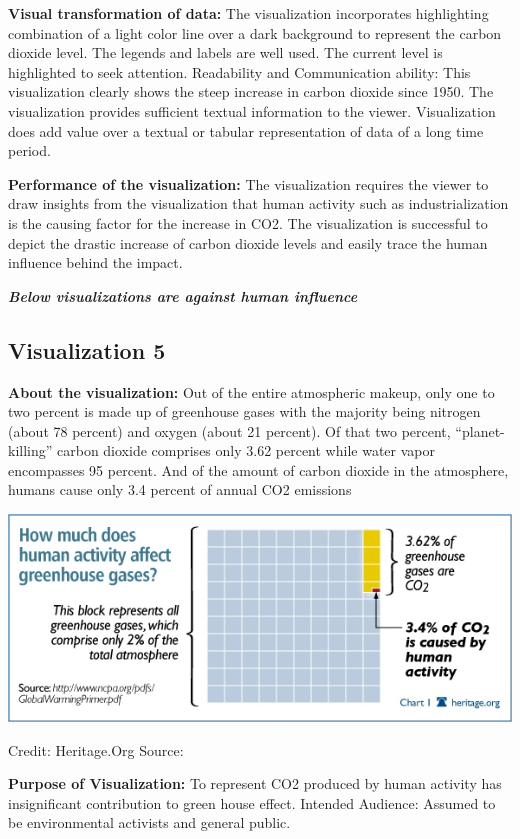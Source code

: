 \documentclass[]{book}
\begin{document}
\textbf{Visual transformation of data:} The visualization incorporates highlighting combination of a light color line over a dark background to represent the carbon dioxide level. The legends and labels are well used. The current level is highlighted to seek attention.
Readability and Communication ability: This visualization clearly shows the steep increase in carbon dioxide since 1950. The visualization provides sufficient textual information to the viewer. Visualization does add value over a textual or tabular representation of data of a long time period.

\textbf{Performance of the visualization:} The visualization requires the viewer to draw insights from the visualization that human activity such as industrialization is the causing factor for the increase in CO2. The visualization is successful to depict the drastic increase of carbon dioxide levels and easily trace the human influence behind the impact.

\textbf{\emph{Below visualizations are against human influence}}

\hypertarget{visualization-5}{%
\subsection{Visualization 5}\label{visualization-5}}

\textbf{About the visualization:} Out of the entire atmospheric makeup, only one to two percent is made up of greenhouse gases with the majority being nitrogen (about 78 percent) and oxygen (about 21 percent). Of that two percent, ``planet-killing'' carbon dioxide comprises only 3.62 percent while water vapor encompasses 95 percent. And of the amount of carbon dioxide in the atmosphere, humans cause only 3.4 percent of annual CO2 emissions

\includegraphics{images/Vz5-Against.png}

Credit: Heritage.Org
Source: \citep{NotHuman}

\textbf{Purpose of Visualization:} To represent CO2 produced by human activity has insignificant contribution to green house effect.
Intended Audience: Assumed to be environmental activists and general public.
\end{document}

